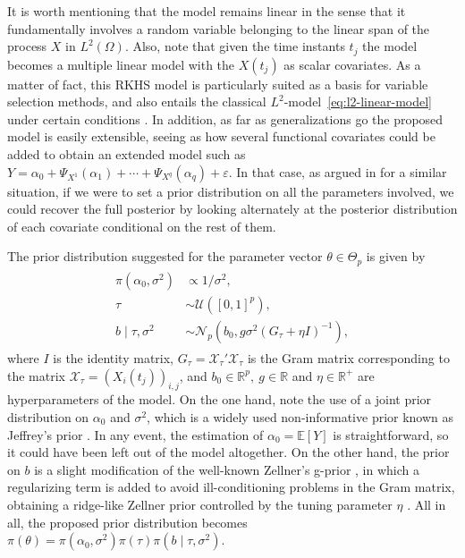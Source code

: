 \documentclass[ba]{imsart}
\numberwithin{equation}{section}
\theoremstyle{plain}
\renewcommand{\epsilon}{\varepsilon}
\newcommand{\R}{\mathbb{R}}
\newcommand{\E}{\mathbb{E}}
\begin{document}
It is worth mentioning that the model remains linear in the sense that it fundamentally involves a random variable belonging to the linear span of the process \(X\) in \(L^2(\Omega)\). Also, note that given the time instants \(t_j\) the model becomes a multiple linear model with the \(X(t_j)\) as scalar covariates. As a matter of fact, this RKHS model is particularly suited as a basis for variable selection methods, and also entails the classical \(L^2\)-model~\eqref{eq:l2-linear-model} under certain conditions \citep[see][Sec.~3]{berrendero2020general}. In addition, as far as generalizations go the proposed model is easily extensible, seeing as how several functional covariates could be added to obtain an extended model such as \(Y=\alpha_0 + \Psi_{X^{1}}(\alpha_1) + \cdots + \Psi_{X^{q}}(\alpha_q) + \epsilon\). In that case, as argued in \citet{grollemund2019bayesian} for a similar situation, if we were to set a prior distribution on all the parameters involved, we could recover the full posterior by looking alternately at the posterior distribution of each covariate conditional on the rest of them.

The prior distribution suggested for the parameter vector \(\theta \in \Theta_p\) is given by
\begin{align}\label{eq:prior-linear}
  \begin{split}
  \pi(\alpha_0, \sigma^2)              & \propto 1/\sigma^2,                                                     \\
  \tau                     & \sim \mathcal U([0, 1]^p),                                              \\
  b\mid \tau, \sigma^2 & \sim \mathcal N_p(b_0, g\sigma^2(G_\tau + \eta I)^{-1}),
\end{split}
\end{align}
where \(I\) is the identity matrix, \(G_\tau = \mathcal X_\tau'\mathcal X_\tau\) is the Gram matrix corresponding to the matrix \(\mathcal X_\tau = (X_i(t_j))_{i,j}\), and \(b_0\in \R^p, \ g \in \R\) and \(\eta \in \R^+\) are hyperparameters of the model. On the one hand, note the use of a joint prior distribution on \(\alpha_0\) and \(\sigma^2\), which is a widely used non-informative prior known as Jeffrey's prior \citep{jeffreys1946invariant}. In any event, the estimation of \(\alpha_0=\E[Y]\) is straightforward, so it could have been left out of the model altogether. On the other hand, the prior on \(b\) is a slight modification of the well-known Zellner's g-prior \citep{zellner1986assessing}, in which a regularizing term is added to avoid ill-conditioning problems in the Gram matrix, obtaining a ridge-like Zellner prior controlled by the tuning parameter \(\eta\) \citep{baragatti2012study}. All in all, the proposed prior distribution becomes \(\pi(\theta) = \pi(\alpha_0, \sigma^2)\pi(\tau)\pi(b\mid \tau, \sigma^2)\).
\end{document}
